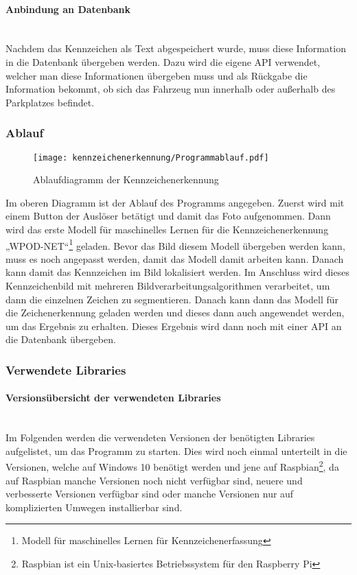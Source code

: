 \paragraph{Anbindung an Datenbank}\mbox{}\\
Nachdem das Kennzeichen als Text abgespeichert wurde, muss diese Information in die Datenbank übergeben werden. Dazu wird die 
eigene API verwendet, welcher man diese Informationen übergeben muss und als Rückgabe die Information bekommt, ob sich das 
Fahrzeug nun innerhalb oder außerhalb des Parkplatzes befindet.

\subsubsection{Ablauf}

\begin{figure}[H]
    \centering
    \texttt{[image: kennzeichenerkennung/Programmablauf.pdf]}
    \caption{Ablaufdiagramm der Kennzeichenerkennung}
\end{figure}

Im oberen Diagramm ist der Ablauf des Programms angegeben. Zuerst wird mit einem Button der Auslöser betätigt und damit das 
Foto aufgenommen. Dann wird das erste Modell für maschinelles Lernen für die Kennzeichenerkennung „WPOD-NET“\footnote{Modell für maschinelles Lernen für Kennzeichenerfassung} geladen. Bevor das 
Bild diesem Modell übergeben werden kann, muss es noch angepasst werden, damit das Modell damit arbeiten kann. Danach kann 
damit das Kennzeichen im Bild lokalisiert werden. Im Anschluss wird dieses Kennzeichenbild mit mehreren Bildverarbeitungsalgorithmen 
verarbeitet, um dann die einzelnen Zeichen zu segmentieren. Danach kann dann das Modell für die Zeichenerkennung geladen 
werden und dieses dann auch angewendet werden, um das Ergebnis zu erhalten. Dieses Ergebnis wird dann noch mit einer API an die Datenbank übergeben.

\subsubsection{Verwendete Libraries}

\paragraph{Versionsübersicht der verwendeten Libraries}\mbox{}\\
Im Folgenden werden die verwendeten Versionen der benötigten Libraries aufgelistet, um das Programm zu starten. Dies wird noch einmal 
unterteilt in die Versionen, welche auf Windows 10 benötigt werden und jene auf Raspbian\footnote{Raspbian ist ein Unix-basiertes Betriebssystem für den Raspberry Pi}, da auf Raspbian manche Versionen noch 
nicht verfügbar sind, neuere und verbesserte Versionen verfügbar sind oder manche Versionen nur auf komplizierten Umwegen installierbar sind.

